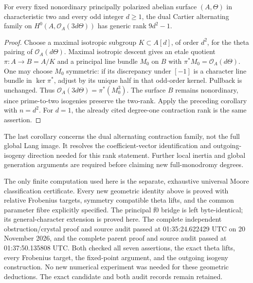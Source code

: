 \begin{corollary}
\label{cor:fixed-ppav-all-odd-maximal-dual-Cartier}
For every fixed nonordinary principally polarized abelian surface
\((A,\Theta)\) in characteristic two and every odd integer
\(d\ge1\), the dual Cartier alternating family on
\(H^0(A,\mathcal O_A(3d\Theta))\) has generic rank
\(9d^2-1\).
\end{corollary}
\begin{proof}
Choose a maximal isotropic subgroup \(K\subset A[d]\), of order
\(d^2\), for the theta pairing of \(\mathcal O_A(d\Theta)\).
Maximal isotropic descent gives an etale quotient
\(\pi:A\to B=A/K\) and a principal line bundle \(M_0\) on
\(B\) with \(\pi^*M_0=\mathcal O_A(d\Theta)\).
One may choose \(M_0\) symmetric: if its discrepancy under
\([-1]\) is a character line bundle in \(\ker\pi^*\), adjust
by its unique half in that odd-order kernel.  Pullback is unchanged.
Thus \(\mathcal O_A(3d\Theta)=\pi^*(M_0^3)\).
The surface \(B\) remains nonordinary, since prime-to-two isogenies
preserve the two-rank.  Apply the preceding corollary with
\(n=d^2\).  For \(d=1\), the already cited degree-one contraction
rank is the same assertion.
\end{proof}

\begin{remark}
\label{rem:ppav-twisted-Cartier-Moore-scope}
The last corollary concerns the dual alternating contraction family,
not the full global Lang image.  It resolves the coefficient-vector
identification and outgoing-isogeny direction needed for this rank
statement.  Further local inertia and global generation arguments
are required before claiming new full-monodromy degrees.

The only finite computation used here is the separate, exhaustive
universal Moore classification certificate.  Every new geometric
identity above is proved with relative Frobenius targets, symmetry
compatible theta lifts, and the common parameter fibre explicitly
specified.  The principal f0 bridge is left byte-identical; its
general-character extension is proved here.  The complete independent obstruction/crystal proof and source audit
passed at 01:35:24.622429 UTC on 20 November 2026, and the complete
parent proof and source audit passed at 01:37:50.135808 UTC.
Both checked all seven assertions, the exact theta lifts, every
Frobenius target, the fixed-point argument, and the outgoing
isogeny construction.  No new numerical experiment was needed
for these geometric deductions.  The exact candidate and both
audit records remain retained.
\end{remark}
